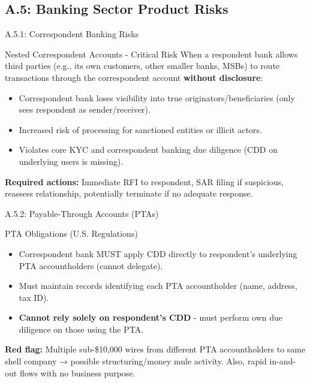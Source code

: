\documentclass{beamer}
\begin{document}
	\subsection{A.5: Banking Sector Product Risks}
	
	\begin{frame}{A.5.1: Correspondent Banking Risks}
		\begin{block}{Nested Correspondent Accounts - Critical Risk}
			When a respondent bank allows third parties (e.g., its own customers, other smaller banks, MSBs) to route transactions through the correspondent account \textbf{without disclosure}:
			\begin{itemize}
				\item Correspondent bank loses visibility into true originators/beneficiaries (only sees respondent as sender/receiver).
				\item Increased risk of processing for sanctioned entities or illicit actors.
				\item Violates core KYC and correspondent banking due diligence (CDD on underlying users is missing).
			\end{itemize}
		\end{block}
		\textbf{Required actions:} Immediate RFI to respondent, SAR filing if suspicious, reassess relationship, potentially terminate if no adequate response.
	\end{frame}
	
	\begin{frame}{A.5.2: Payable-Through Accounts (PTAs)}
		\begin{block}{PTA Obligations (U.S. Regulations)}
			\begin{itemize}
				\item Correspondent bank MUST apply CDD directly to respondent's underlying PTA accountholders (cannot delegate).
				\item Must maintain records identifying each PTA accountholder (name, address, tax ID).
				\item \textbf{Cannot rely solely on respondent's CDD} - must perform own due diligence on those using the PTA.
			\end{itemize}
		\end{block}
		\textbf{Red flag:} Multiple sub-\$10,000 wires from different PTA accountholders to same shell company → possible structuring/money mule activity. Also, rapid in-and-out flows with no business purpose.
	\end{frame}
	
\end{document}
